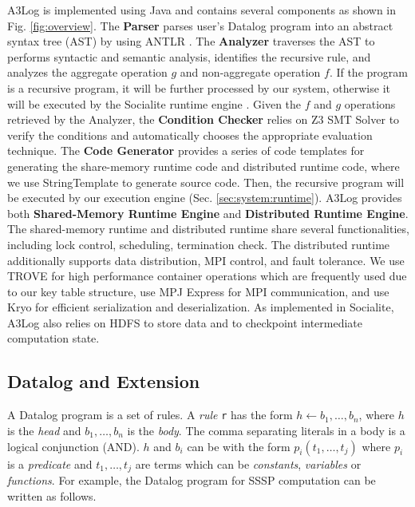 \documentclass{vldb}
\begin{document}
A3Log is implemented using Java and contains several components as shown in Fig. \ref{fig:overview}. The \textbf{Parser} parses user's Datalog program into an abstract syntax tree (AST) by using ANTLR \cite{antlr}. The \textbf{Analyzer} traverses the AST to performs syntactic and semantic analysis, identifies the recursive rule, and analyzes the aggregate operation $g$ and non-aggregate operation $f$. If the program is a recursive program, it will be further processed by our system, otherwise it will be executed by the Socialite runtime engine \cite{Lam:2013:SDE:2510649.2511289,Seo:2013:DSD:2556549.2556572}. Given the $f$ and $g$ operations retrieved by the Analyzer, the \textbf{Condition Checker} relies on Z3 SMT Solver \cite{DeMoura:2008:ZES:1792734.1792766,z3} to verify the conditions and automatically chooses the appropriate evaluation technique. The \textbf{Code Generator} provides a series of code templates for generating the share-memory runtime code and distributed runtime code, where we use StringTemplate \cite{stringtemplate} to generate source code. Then, the recursive program will be executed by our execution engine (Sec. \ref{sec:system:runtime}). A3Log provides both \textbf{Shared-Memory Runtime Engine} and \textbf{Distributed Runtime Engine}. The shared-memory runtime and distributed runtime share several functionalities, including lock control, scheduling, termination check. The distributed runtime additionally supports data distribution, MPI control, and fault tolerance. We use TROVE \cite{trove} for high performance container operations which are frequently used due to our key table structure, use MPJ Express \cite{mpich} for MPI communication, and use Kryo \cite{kryo} for efficient serialization and deserialization. As implemented in Socialite, A3Log also relies on HDFS to store data and to checkpoint intermediate computation state.

\subsection{Datalog and Extension}
\label{sec:system:datalog}

A Datalog program is a set of rules. A \emph{rule} \texttt{r} has the form $h\leftarrow b_1,\ldots,b_n$, where $h$ is the \emph{head} and $b_1,\ldots,b_n$ is the \emph{body}. The comma separating literals in a body is a logical conjunction (AND). $h$ and $b_i$ can be with the form $p_i(t_1,\ldots,t_j)$ where $p_i$ is a \emph{predicate} and $t_1,\ldots,t_j$ are terms which can be \emph{constants}, \emph{variables} or \emph{functions}. For example, the Datalog program for SSSP computation can be written as follows.
\end{document}
